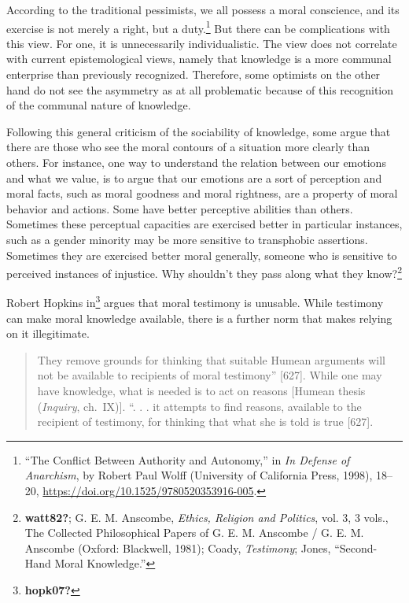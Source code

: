 \documentclass[phdthesis,12pt,final]{wuthesis}
\theoremstyle{definition}
\theoremstyle{definition}
\theoremstyle{definition}
\theoremstyle{definition}
\theoremstyle{remark}
\begin{document}
According to the traditional pessimists, we all possess a moral conscience, and its exercise is not merely a right, but a duty.\footnote{{``The {Conflict Between Authority} and {Autonomy},''} in \emph{In {Defense} of {Anarchism}}, by Robert Paul Wolff (University of California Press, 1998), 18--20, \url{https://doi.org/10.1525/9780520353916-005}.} But there can be complications with this view. For one, it is unnecessarily individualistic. The view does not correlate with current epistemological views, namely that knowledge is a more communal enterprise than previously recognized. Therefore, some optimists on the other hand do not see the asymmetry as at all problematic because of this recognition of the communal nature of knowledge.

Following this general criticism of the sociability of knowledge, some argue that there are those who see the moral contours of a situation more clearly than others. For instance, one way to understand the relation between our emotions and what we value, is to argue that our emotions are a sort of perception and moral facts, such as moral goodness and moral rightness, are a property of moral behavior and actions. Some have better perceptive abilities than others. Sometimes these perceptual capacities are exercised better in particular instances, such as a gender minority may be more sensitive to transphobic assertions. Sometimes they are exercised better moral generally, someone who is sensitive to perceived instances of injustice. Why shouldn't they pass along what they know?\footnote{\textbf{watt82?}; G. E. M. Anscombe, \emph{Ethics, Religion and Politics}, vol. 3, 3 vols., The Collected Philosophical Papers of {G}. {E}. {M}. {Anscombe} / {G}. {E}. {M}. {Anscombe} (Oxford: Blackwell, 1981); Coady, \emph{Testimony}; Jones, {``Second-{Hand Moral Knowledge}.''}}

Robert Hopkins in\footnote{\textbf{hopk07?}} argues that moral testimony is unusable. While testimony can make moral knowledge available, there is a further norm that makes relying on it illegitimate.

\begin{quote}
They remove grounds for thinking that suitable Humean arguments will not be available to recipients of moral testimony'' {[}627{]}. While one may have knowledge, what is needed is to act on reasons {[}Humean thesis (\emph{Inquiry}, ch.~IX){]}. ``. . . it attempts to find reasons, available to the recipient of testimony, for thinking that what she is told is true {[}627{]}.
\end{quote}
\end{document}
